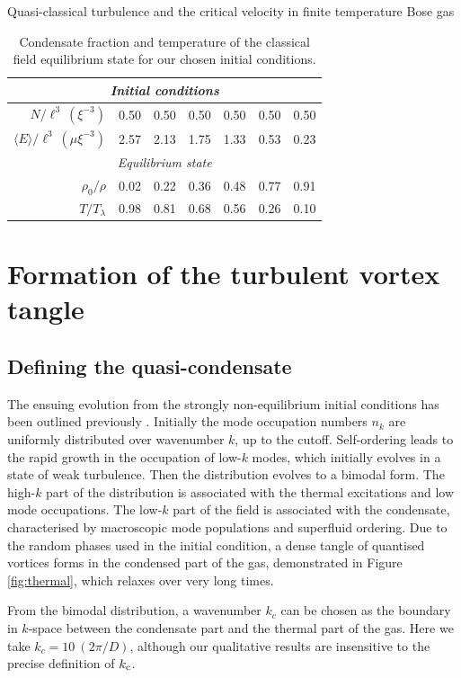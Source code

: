 \begin{chapter}{\label{cha:nonequib}Quasi-classical turbulence and the critical velocity in finite temperature Bose gas}
\begin{table}
\centering
\begin{tabular}{rcccccc}
\multicolumn{7}{c}{\it Initial conditions} \\
\hline
\rule{0pt}{3ex}$N/\ell^3~(\xi^{-3})$           & 0.50 & 0.50 & 0.50 & 0.50 & 0.50 & 0.50 \\
$\langle E \rangle/\ell^3~(\mu \xi^{-3})$  & 2.57 & 2.13 & 1.75 & 1.33 & 0.53 & 0.23 \\
\multicolumn{7}{c}{\it Equilibrium state} \\
\hline
\rule{0pt}{3ex}$\rho_0/\rho$        & 0.02 & 0.22 & 0.36 & 0.48 & 0.77 & 0.91 \\
$T/T_\lambda$        & 0.98 & 0.81 & 0.68 & 0.56 & 0.26 & 0.10
\end{tabular}
\caption{Condensate fraction and temperature of the classical field equilibrium state for our chosen initial conditions.}
\label{tbl:cond_frac}
\end{table}

\section{Formation of the turbulent vortex tangle}
\subsection{Defining the quasi-condensate}
The ensuing evolution from the strongly non-equilibrium initial conditions has been outlined previously \cite{PhysRevA.66.013603,pattinson_2014}.  Initially the mode occupation numbers $n_k$ are uniformly distributed over wavenumber $k$, up to the cutoff.  Self-ordering leads to the rapid growth in the occupation of low-$k$ modes, which initially evolves in a state of weak turbulence.  Then the distribution evolves to a bimodal form.
The high-$k$ part of the distribution is associated with the
thermal excitations and low mode occupations. The low-$k$ part of the field is associated with the condensate, characterised by macroscopic mode populations and superfluid ordering. Due to the random phases used in the initial condition, a dense tangle of quantised vortices forms in the condensed part of the gas, demonstrated in Figure \ref{fig:thermal}, which relaxes over very long times.

From the bimodal distribution, a wavenumber $k_c$ can be chosen as the boundary in $k$-space between the condensate part and the thermal part of the gas.  Here we take $k_c = 10~(2\pi/D)$, although our qualitative results are insensitive to the precise definition of $k_{\rm c}$. 


\end{chapter}
